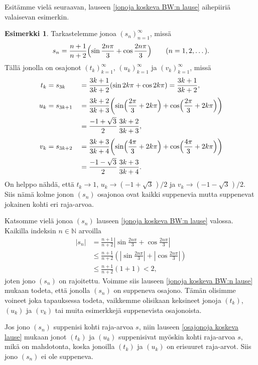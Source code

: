 \documentclass[a4paper,12pt,leqno,oneside]{report} %
\theoremstyle{plain}
\theoremstyle{definition}
\newtheorem{esimerkki}{Esimerkki}[chapter]
\theoremstyle{remark}
\numberwithin{equation}{chapter}
\newcommand*{\Nset}{\mathbb{N}}  %
\newcommand*{\abs}[1]{\left\lvert#1\right\rvert}   %
\begin{document}
Esitämme vielä seuraavan, lauseen \ref{jonoja koskeva BW:n lause} aihepiiriä valaisevan esimerkin.

\begin{esimerkki}
Tarkastelemme jonoa $(s_n)_{n=1}^\infty$, missä
\[
    s_n = \frac{n+1}{n+2}\Bigl(\sin\frac{2n\pi}{3} + \cos\frac{2n\pi}{3}\Bigr)
    \qquad (n = 1,2,\dots).
\]
Tällä jonolla on osajonot $(t_k)_{k=1}^\infty$, $(u_k)_{k=1}^\infty$
ja $(v_k)_{k=1}^\infty$, missä
\begin{alignat*}{2}
    t_k &= s_{3k}   & &= \frac{3k+1}{3k+2}(\sin 2k\pi +\cos 2k\pi) = \frac{3k+1}{3k+2}, \\[\jot]
    u_k &= s_{3k+1} & &= \frac{3k+2}{3k+3}\biggl(\sin\Bigl(\frac{2\pi}{3}
                         + 2k\pi\Bigr) + \cos\Bigl(\frac{2\pi}{3} + 2k\pi\Bigr)\biggr) \\
        &           & &= \frac{-1 + \sqrt{3}}{2}\,\frac{3k+2}{3k+3}, \\[\jot]
    v_k &= s_{3k+2} & &= \frac{3k+3}{3k+4}\biggl(\sin\Bigl(\frac{4\pi}{3} + 2k\pi\Bigr)
                         + \cos\Bigl(\frac{4\pi}{3} + 2k\pi\Bigr)\biggr) \\
        &           & &= \frac{-1 - \sqrt 3}{2}\,\frac{3k+3}{3k+4}.
\end{alignat*}
On helppo nähdä, että $t_k\to 1$, $u_k\to(-1 + \sqrt{3}\mspace{2mu})/2$ ja $v_k\to(-1 - \sqrt{3}\mspace{2mu})/2$. Siis nämä kolme jonon $(s_n)$ osajonoa ovat kaikki suppenevia mutta suppenevat jokainen kohti eri raja-arvoa.

Katsomme vielä jonoa $(s_n)$ lauseen \ref{jonoja koskeva BW:n lause} valossa. Kaikilla indeksin $n\in\Nset$ arvoilla
\begin{align*}
    \abs{s_n}
    &= \frac{n+1}{n+2} \abs{\sin\frac{2n\pi}{3} + \cos\frac{2n\pi}{3}} \\
    &\le \frac{n+1}{n+2}\left(\abs{\sin\frac{2n\pi}{3}}
         + \abs{\cos\frac{2n\pi}{3}}\right) \\
    &\le \frac{n+1}{n+2}(1 + 1) < 2,
\end{align*}
joten jono $(s_n)$ on rajoitettu. Voimme siis lauseen \ref{jonoja koskeva BW:n lause} mukaan todeta, että jonolla $(s_n)$ on suppeneva osajono. Tämän olisimme voineet joka tapauksessa todeta, vaikkemme olisikaan keksineet jonoja $(t_k)$, $(u_k)$ ja $(v_k)$ tai muita esimerkkejä suppenevista osajonoista.

Jos jono $(s_n)$ suppenisi kohti raja-arvoa $s$, niin lauseen \ref{osajonoja koskeva lause} mukaan jonot $(t_k)$ ja $(u_k)$ suppenisivat myöskin kohti raja-arvoa $s$, mikä on mahdotonta, koska jonoilla $(t_k)$ ja $(u_k)$ on erisuuret raja-arvot. Siis jono $(s_n)$ ei ole suppeneva.
\end{esimerkki}
\end{document}
